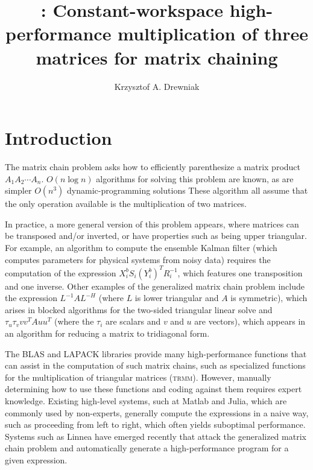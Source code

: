 \documentclass[12pt]{article}
\title{\gemmt{}: Constant-workspace high-performance multiplication of three matrices for matrix chaining}
\author{Krzysztof A. Drewniak}
\begin{document}
\maketitle{}
\section{Introduction}
The matrix chain problem asks how to efficiently parenthesize a matrix product $A_1A_2\cdots A_n$.
$O(n \log n)$ algorithms for solving this problem are known\cite{Hu1984}, as are simpler $O(n^3)$ dynamic-programming solutions\cite{Barthels2018}
These algorithm all assume that the only operation available is the multiplication of two matrices.

In practice, a more general version of this problem appears, where matrices can be transposed and/or inverted, or have properties such as being upper triangular\cite{Barthels2018}.
For example, an algorithm to compute the ensemble Kalman filter\cite{Rao2017} (which computes parameters for physical systems from noisy data) requires the computation of the expression $X_i^b S_i (Y_i^b)^T R_i^{-1}$, which features one transposition and one inverse.
Other examples of the generalized matrix chain problem include the expression $L^{-1}AL^{-H}$ (where $L$ is lower triangular and $A$ is symmetric), which arises in blocked algorithms for the two-sided triangular linear solve\cite{Parikh2017} and $\tau_u\tau_v vv^TAuu^T$ (where the $\tau_i$ are scalars and $v$ and $u$ are vectors), which appears in an algorithm for reducing a matrix to tridiagonal form\cite{Choi1995}.

The BLAS and LAPACK libraries provide many high-performance functions that can assist in the computation of such matrix chains, such as specialized functions for the multiplication of triangular matrices (\textsc{trmm}).
However, manually determining how to use these functions and coding against them requires expert knowledge.
Existing high-level systems, such at Matlab and Julia, which are commonly used by non-experts, generally compute the expressions in a naive way, such as proceeding from left to right, which often yields suboptimal performance.
Systems such as Linnea\cite{Barthels2017} have emerged recently that attack the generalized matrix chain problem and automatically generate a high-performance program for a given expression.
\end{document}
